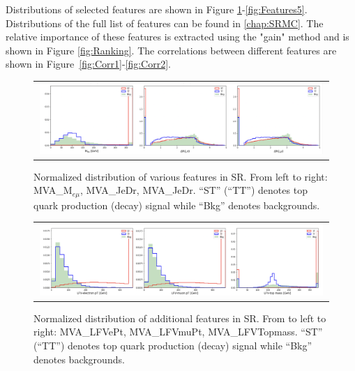 \begin{table}[th]
\sffamily
\centering
\caption{Features only used by \ac{BDT} trained in \ac{SR}2}
\label{tab:SR2Features}
\end{table}

Distributions of selected features are shown in Figure \ref{fig:Features1}-\ref{fig:Features5}. Distributions of the full list of features can be found in \autoref{chap:SRMC}. The relative importance of these features is extracted using the "gain" method and is shown in Figure \ref{fig:Ranking}. The correlations between different features are shown in Figure~\ref{fig:Corr1}-\ref{fig:Corr2}.

\begin{figure}[tbh!]
 \begin{center}
 \begin{tabular}{c}
 \includegraphics[width=0.99\textwidth]{figures/Part3/BDT/Features1}\\
 \end{tabular}
 \caption{Normalized distribution of various features in SR. From left to right: MVA\_M$_{e\mu}$, MVA\_JeDr, MVA\_JeDr. ``ST'' (``TT'') denotes top quark production (decay) signal while ``Bkg'' denotes backgrounds.}
 \label{fig:Features1}
 \end{center}
\end{figure}

\begin{figure}[tbh!]
 \begin{center}
 \begin{tabular}{c}
 \includegraphics[width=0.99\textwidth]{figures/Part3/BDT/Features2}\\
 \end{tabular}
 \caption{Normalized distribution of additional features in SR. From to left to right: MVA\_LFVePt, MVA\_LFVmuPt, MVA\_LFVTopmass. ``ST'' (``TT'') denotes top quark production (decay) signal while ``Bkg'' denotes backgrounds.}
 \label{fig:Features2}
 \end{center}
\end{figure}

